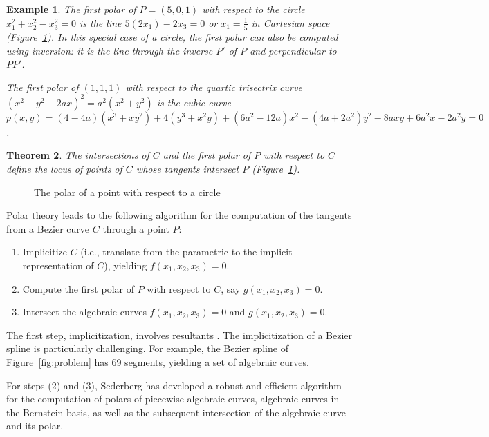 \documentclass[twocolumn,10pt]{article}
\newtheorem{theorem}{Theorem}[section]
\newtheorem{example}[theorem]{Example}
\begin{document}
\begin{example}
The first polar of $P=(5,0,1)$ with respect to the circle 
$x_1^2 + x_2^2 - x_3^2 = 0$ is the line
$5(2x_1) - 2x_3 = 0$ or $x_1 = \frac{1}{5}$ in Cartesian space
(Figure~\ref{fig:polar}).
In this special case of a circle, the first polar can also be computed
using inversion: it is the line through the inverse $P'$ of $P$ 
and perpendicular to $PP'$.

The first polar of $(1,1,1)$ with respect to the quartic trisectrix curve
$(x^2 + y^2 - 2ax)^2 = a^2(x^2 + y^2)$ \cite{lawrence72} %
is the cubic curve $p(x,y) = 
(4-4a)(x^3 + xy^2) + 4(y^3 + x^2y) + (6a^2 - 12a)x^2 - (4a+2a^2)y^2 - 8axy + 6a^2x - 2a^2y = 0$.
\end{example}

\begin{theorem}
The intersections of $C$ and the first polar of $P$ with respect to $C$ 
define the locus of points of $C$ whose tangents intersect $P$ 
(Figure~\ref{fig:polar}).
\end{theorem}



\begin{figure}[h]
\hspace{0in} \setjjpopo
\caption{The polar of a point with respect to a circle}
\label{fig:polar}
\end{figure}

Polar theory leads to the following algorithm for the computation of the 
tangents from a Bezier curve $C$ through a point $P$:
\begin{enumerate}
\item	Implicitize $C$ (i.e., translate from the parametric to the implicit
representation of $C$), yielding $f(x_1,x_2,x_3)=0$.
\item	Compute the first polar of $P$ with respect to $C$, say $g(x_1,x_2,x_3)=0$.
\item	Intersect the algebraic curves $f(x_1,x_2,x_3)=0$ and $g(x_1,x_2,x_3)=0$.
\end{enumerate}

The first step, implicitization,
involves resultants \cite{sederberg84,sederberg95}.
The implicitization of a Bezier spline is particularly challenging.
For example, the Bezier spline of Figure~\ref{fig:problem} has 69 segments,
yielding a set of algebraic curves.

For steps (2) and (3),
Sederberg \cite{sederberg89} has developed a robust and efficient algorithm
for the computation of polars of piecewise algebraic curves, algebraic curves
in the Bernstein basis, as well as the subsequent intersection of the 
algebraic curve and its polar.
\end{document}
